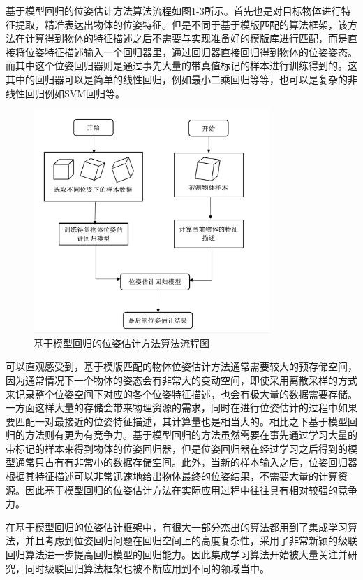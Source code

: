 基于模型回归的位姿估计方法算法流程如图1-3所示。首先也是对目标物体进行特征提取，精准表达出物体的位姿特征。但是不同于基于模版匹配的算法框架，该方法在计算得到物体的特征描述之后不需要与实现准备好的模版库进行匹配，而是直接将位姿特征描述输入一个回归器里，通过回归器直接回归得到物体的位姿姿态。而其中这个位姿回归器则是通过事先大量的带真值标记的样本进行训练得到的。这其中的回归器可以是简单的线性回归，例如最小二乘回归等等，也可以是复杂的非线性回归例如SVM回归\cite{basak2007support}等。
\begin{figure}[htb]
	\centering 
	\includegraphics[width=0.8\textwidth]{./mypic/基于模型回归的位姿估计方法算法流程图.jpg} 
	\caption{基于模型回归的位姿估计方法算法流程图} 
\end{figure}

可以直观感受到，基于模版匹配的物体位姿估计方法通常需要较大的预存储空间，因为通常情况下一个物体的姿态会有非常大的变动空间，即使采用离散采样的方式来记录整个位姿空间下对应的各个位姿特征描述，也会有极大量的数据需要存储。一方面这样大量的存储会带来物理资源的需求，同时在进行位姿估计的过程中如果要匹配一对最接近的位姿特征描述，其计算量也是相当大的。相比之下基于模型回归的方法则有更为有竞争力。基于模型回归的方法虽然需要在事先通过学习大量的带标记的样本来得到物体的位姿回归器，但是位姿回归器在经过学习之后得到的模型通常只占有有非常小的数据存储空间。此外，当新的样本输入之后，位姿回归器根据其特征描述可以非常迅速地给出物体最终的位姿结果，不需要大量的计算资源。因此基于模型回归的位姿估计方法在实际应用过程中往往具有相对较强的竞争力。

在基于模型回归的位姿估计框架中，有很大一部分杰出的算法都用到了集成学习算法，并且考虑到位姿回归问题在回归空间上的高度复杂性，采用了非常新颖的级联回归算法进一步提高回归模型的回归能力。因此集成学习算法开始被大量关注并研究，同时级联回归算法框架也被不断应用到不同的领域当中。


